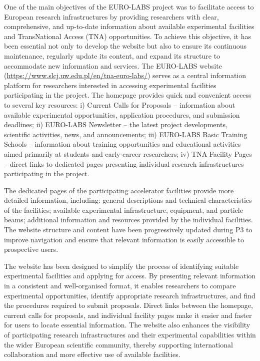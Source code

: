 One of the main objectives of the EURO-LABS project was to facilitate access to European research infrastructures by providing researchers with clear, comprehensive, and up-to-date information about available experimental facilities and TransNational Access (TNA) opportunities.
To achieve this objective, it has been essential not only to develop the website but also to ensure its continuous maintenance, regularly update its content, and expand its structure to accommodate new information and services.
The EURO-LABS website (\url{https://www.slcj.uw.edu.pl/en/tna-euro-labs/}) serves as a central information platform for researchers interested in accessing experimental facilities participating in the project.
The homepage provides quick and convenient access to several key resources:
i) Current Calls for Proposals – information about available experimental opportunities, application procedures, and submission deadlines; 
ii) EURO-LABS Newsletter – the latest project developments, scientific activities, news, and announcements; 
iii) EURO-LABS Basic Training Schools – information about training opportunities and educational activities aimed primarily at students and early-career researchers;
iv) TNA Facility Pages – direct links to dedicated pages presenting individual research infrastructures participating in the project.

The dedicated pages of the participating accelerator facilities provide more detailed information, including: general descriptions and technical characteristics of the facilities; available experimental infrastructure, equipment, and particle beams; additional information and resources provided by the individual facilities.
The website structure and content have been progressively updated during P3 to improve navigation and ensure that relevant information is easily accessible to prospective users.

The website has been designed to simplify the process of identifying suitable experimental facilities and applying for access.
By presenting relevant information in a consistent and well-organised format, it enables researchers to compare experimental opportunities, identify appropriate research infrastructures, and find the procedures required to submit proposals.
Direct links between the homepage, current calls for proposals, and individual facility pages make it easier and faster for users to locate essential information.
The website also enhances the visibility of participating research infrastructures and their experimental capabilities within the wider European scientific community, thereby supporting international collaboration and more effective use of available facilities.

